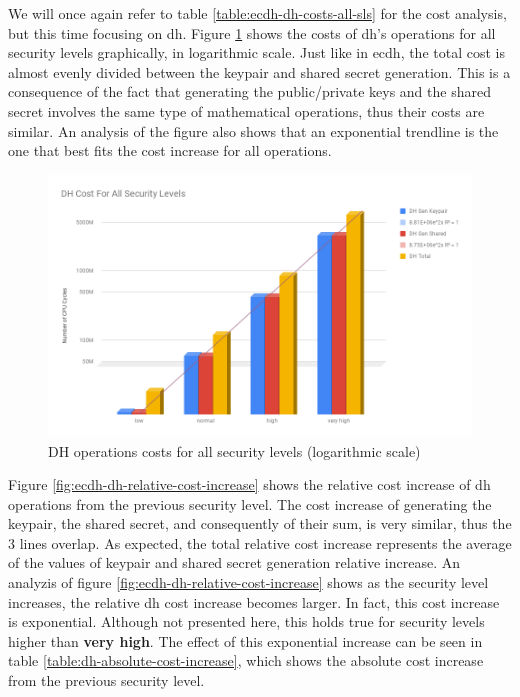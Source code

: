 We will once again refer to table \ref{table:ecdh-dh-costs-all-sls} for the cost analysis, but this time focusing on \gls{dh}. Figure
\ref{fig:dh-costs-all-sls} shows the costs of \gls{dh}'s operations for all security levels graphically, in logarithmic scale. Just like in \gls{ecdh}, the total cost
is almost evenly divided between the keypair and shared secret generation. This is a consequence of the fact that generating the public/private keys
and the shared secret involves the same type of mathematical operations, thus their costs are similar. An analysis of the figure
also shows that an exponential trendline is the one that best fits the cost increase for all operations.

  \begin{figure}
    \centering
    \includegraphics[width=1.0\textwidth]{img/dh_costs_all_sls.png}
    \centering \caption{\label{fig:dh-costs-all-sls} DH operations costs for all security levels (logarithmic scale)}
  \end{figure}

Figure \ref{fig:ecdh-dh-relative-cost-increase} shows the relative cost increase of \gls{dh} operations from the previous security level.
The cost increase of generating the keypair, the shared secret, and consequently of their sum, is very similar, thus the $3$ lines overlap.
As expected, the total relative cost increase represents the average of the values of keypair and shared secret generation relative increase.
An analyzis of figure \ref{fig:ecdh-dh-relative-cost-increase} shows as the security level increases, the relative 
\gls{dh} cost increase becomes larger. In fact, this cost increase is exponential. Although not presented here, this holds true for 
security levels higher than \textbf{very high}. The effect of this exponential increase can be seen in table 
\ref{table:dh-absolute-cost-increase}, which shows the absolute cost increase from the previous security level.

